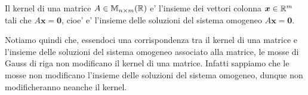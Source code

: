 \begin{remark}
    Il kernel di una matrice $A \in \mathbb{M}_{n \times m}(\mathbb{R})$ e' l'insieme dei vettori colonna $\bm{x} \in \mathbb{R}^m$ tali che $A\bm{x} = \bm{0}$, cioe' e' l'insieme delle soluzioni del sistema omogeneo $A\bm{x}= \bm{0}$.
\end{remark}

Notiamo quindi che, essendoci una corrispondenza tra il kernel di una matrice e l'insieme delle soluzioni del sistema omogeneo associato alla matrice, le mosse di Gauss di riga non modificano il kernel di una matrice. Infatti sappiamo che le mosse non modificano l'insieme delle soluzioni del sistema omogeneo, dunque non modificheranno neanche il kernel.
